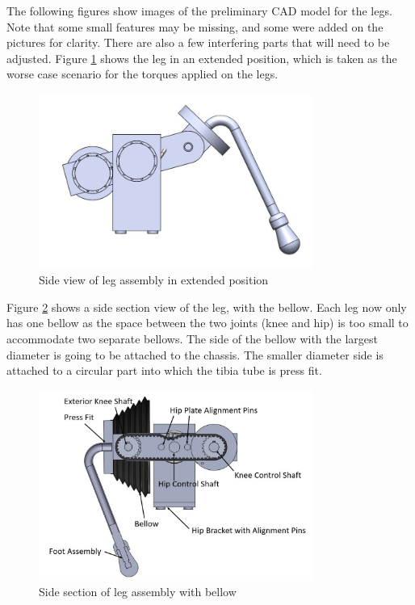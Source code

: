 The following figures show images of the preliminary CAD model for the legs. Note that some small features may be missing, and some were added on the pictures for clarity. There are also a few interfering parts that will need to be adjusted. Figure \ref{fig:leg_side} shows the leg in an extended position, which is taken as the worse case scenario for the torques applied on the legs.

\begin{figure}
    \centering
    \includegraphics[width=0.8\textwidth]{2_DetailedDesign/img/LegSideView.JPG}
    \caption{Side view of leg assembly in extended position}
    \label{fig:leg_side}
\end{figure}

Figure \ref{fig:leg_side_sec} shows a side section view of the leg, with the bellow. Each leg now only has one bellow as the space between the two joints (knee and hip) is too small to accommodate two separate bellows. The side of the bellow with the largest diameter is going to be attached to the chassis. The smaller diameter side is attached to a circular part into which the tibia tube is press fit. 

\begin{figure}
    \centering
    \includegraphics[width=0.8\textwidth]{2_DetailedDesign/img/LegSideSection_a.JPG}
    \caption{Side section of leg assembly with bellow}
    \label{fig:leg_side_sec}
\end{figure}

